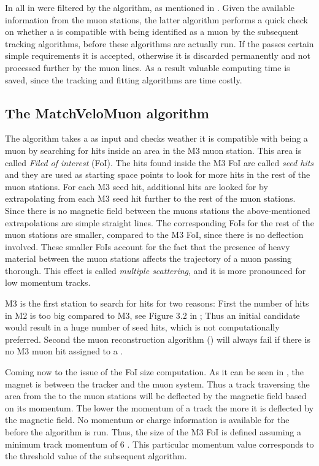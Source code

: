 In \runone all \veloTracks in \hltone were filtered by the \mvm algorithm, as mentioned in .
Given the available information from the muon stations, the latter algorithm performs a quick check on whether a \veloTrack is compatible
with being identified as a muon by the subsequent tracking algorithms, before these algorithms are actually run.
If the \veloTrack passes certain simple requirements it
is accepted, otherwise it is discarded permanently and not processed further by the \hlt muon lines. As a result
valuable computing time is saved, since the \FwD tracking and fitting algorithms are time costly.

\subsection{The MatchVeloMuon algorithm}
\label{sec:muon_matching}

The \mvm algorithm takes a \veloTrack as input and checks weather it is compatible with being a muon by
searching for hits inside an area in the M3 muon station. This area is called {\it Filed of interest} (FoI).
The hits found inside the M3 FoI are called {\it seed hits} and they are used as starting space points to look
for more hits in the rest of the muon stations. For each M3 seed hit, additional hits are looked for
by extrapolating from each M3 seed hit further to the rest of the muon stations.
Since there is no magnetic field between the muons stations the above-mentioned extrapolations are simple straight lines.
The corresponding FoIs for the rest of the muon stations are smaller, compared to the M3 FoI, since there
is no deflection involved. These smaller FoIs account for the fact that the presence of heavy material
between the muon stations affects the trajectory of a muon passing thorough. This effect is called {\it multiple
scattering}, and it is more pronounced for low momentum tracks.

M3 is the first station to search for hits for two reasons: First the number of hits in M2 is too big compared
to M3, see Figure 3.2 in \cite{roelThesis}; Thus an initial \veloTrack candidate would result in a huge number
of seed hits, which is not computationally preferred. Second the muon reconstruction algorithm (\isMuon) will
always fail if there is no M3 muon hit assigned to a \veloTrack.

Coming now to the issue of the FoI size computation. As it can be seen in ,
the \lhcb magnet is between the \velo tracker and the muon system. Thus a track traversing the area from the
\velo to the muon stations will be deflected by the magnetic field based on its momentum.  The lower the momentum
of a track the more it is deflected by the magnetic field. No momentum or charge information is available for
the \veloTrack before the \FwD algorithm is run. Thus, the size of the M3 FoI is defined assuming a minimum
track momentum of 6 \gevc. This particular momentum value corresponds to the threshold value of the subsequent
\isMuon algorithm.

